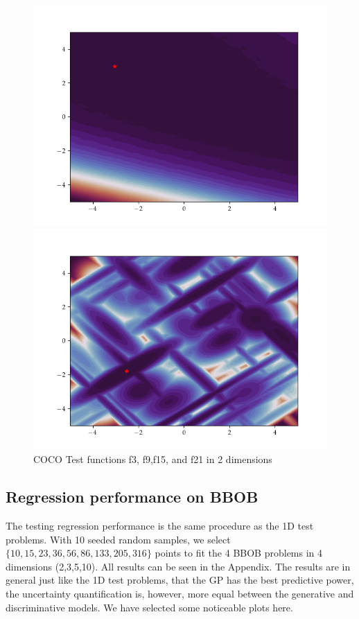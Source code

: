 \begin{figure}[h]
\begin{minipage}[b]{0.24\textwidth}
    \includegraphics[trim=2.5cm 1.3cm 2.5cm 1.3cm,clip,width=\textwidth]{Figures/coco/f15.png}
  \end{minipage}
  \hfill
  \begin{minipage}[b]{0.24\textwidth}
    \includegraphics[trim=2.5cm 1.3cm 2.5cm 1.3cm,clip,width=\textwidth]{Figures/coco/f21.png}
  \end{minipage}
  
  \caption{COCO Test functions f3, f9,f15, and f21 in 2 dimensions}
  \label{COCO_tests}
\end{figure}

\subsection{Regression performance on BBOB}
The testing regression performance is the same procedure as the 1D test problems. With 10 seeded random
samples, we select $\{10, 15, 23, 36, 56, 86, 133, 205, 316\}$ points to fit the 4 BBOB problems in 4 dimensions
(2,3,5,10). All results can be seen in the Appendix. The results are in general just like the 1D test problems, 
that the GP has the best predictive power, the uncertainty quantification is, however, more equal between
the generative and discriminative models. We have selected some noticeable plots here. 


